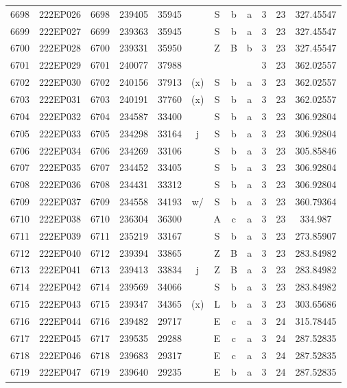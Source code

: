 \begin{tabular}{|*{12}{c|}}
6698 & 222EP026 & 6698 & 239405 & 35945 &  & S & b & a & 3 & 23 & 327.45547 \\ 
6699 & 222EP027 & 6699 & 239363 & 35945 &  & S & b & a & 3 & 23 & 327.45547 \\ 
6700 & 222EP028 & 6700 & 239331 & 35950 &  & Z & B & b & 3 & 23 & 327.45547 \\ 
6701 & 222EP029 & 6701 & 240077 & 37988 &  &  &  &  & 3 & 23 & 362.02557 \\ 
6702 & 222EP030 & 6702 & 240156 & 37913 & (x) & S & b & a & 3 & 23 & 362.02557 \\ 
6703 & 222EP031 & 6703 & 240191 & 37760 & (x) & S & b & a & 3 & 23 & 362.02557 \\ 
6704 & 222EP032 & 6704 & 234587 & 33400 &  & S & b & a & 3 & 23 & 306.92804 \\ 
6705 & 222EP033 & 6705 & 234298 & 33164 & j & S & b & a & 3 & 23 & 306.92804 \\ 
6706 & 222EP034 & 6706 & 234269 & 33106 &  & S & b & a & 3 & 23 & 305.85846 \\ 
6707 & 222EP035 & 6707 & 234452 & 33405 &  & S & b & a & 3 & 23 & 306.92804 \\ 
6708 & 222EP036 & 6708 & 234431 & 33312 &  & S & b & a & 3 & 23 & 306.92804 \\ 
6709 & 222EP037 & 6709 & 234558 & 34193 & w/ & S & b & a & 3 & 23 & 360.79364 \\ 
6710 & 222EP038 & 6710 & 236304 & 36300 &  & A & c & a & 3 & 23 & 334.987 \\ 
6711 & 222EP039 & 6711 & 235219 & 33167 &  & S & b & a & 3 & 23 & 273.85907 \\ 
6712 & 222EP040 & 6712 & 239394 & 33865 &  & Z & B & a & 3 & 23 & 283.84982 \\ 
6713 & 222EP041 & 6713 & 239413 & 33834 & j & Z & B & a & 3 & 23 & 283.84982 \\ 
6714 & 222EP042 & 6714 & 239569 & 34066 &  & S & b & a & 3 & 23 & 283.84982 \\ 
6715 & 222EP043 & 6715 & 239347 & 34365 & (x) & L & b & a & 3 & 23 & 303.65686 \\ 
6716 & 222EP044 & 6716 & 239482 & 29717 &  & E & c & a & 3 & 24 & 315.78445 \\ 
6717 & 222EP045 & 6717 & 239535 & 29288 &  & E & c & a & 3 & 24 & 287.52835 \\ 
6718 & 222EP046 & 6718 & 239683 & 29317 &  & E & c & a & 3 & 24 & 287.52835 \\ 
6719 & 222EP047 & 6719 & 239640 & 29235 &  & E & b & a & 3 & 24 & 287.52835 \\ 

\end{tabular}
